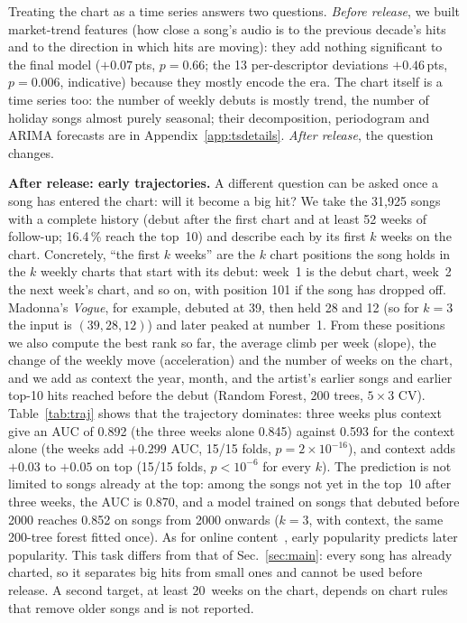\documentclass[conference]{IEEEtran}
\newcommand{\pp}{\,pts}
\begin{document}
Treating the chart as a time series answers two questions. \emph{Before release}, we built
market-trend features (how close a song's audio is to the previous decade's hits and to the direction in which
hits are moving): they add nothing significant to the final model ($+0.07$\pp, $p=0.66$; the 13 per-descriptor deviations
$+0.46$\pp, $p=0.006$, indicative) because they mostly encode the era.
The chart itself is a time series too: the number of weekly debuts is mostly trend, the number of holiday songs
almost purely seasonal; their decomposition, periodogram and ARIMA forecasts
are in Appendix~\ref{app:tsdetails}. \emph{After release}, the question changes.


\textbf{After release: early trajectories.} A different question can be asked once a song
has entered the chart: will it become a big hit? We take the 31{,}925 songs with a complete
history (debut after the first chart and at least 52 weeks of follow-up; 16.4\,\% reach
the top~10) and describe each by its first $k$ weeks on the chart. Concretely, ``the first
$k$ weeks'' are the $k$ chart positions the song holds in the $k$ weekly charts that start with
its debut: week~1 is the debut chart, week~2 the next week's chart, and so on, with position 101
if the song has dropped off. Madonna's \textit{Vogue}, for example, debuted at 39, then held 28
and 12 (so for $k=3$ the input is $(39, 28, 12)$) and later peaked at number~1. From these
positions we also compute the best rank so far, the average climb per week (slope), the change
of the weekly move (acceleration) and the number of weeks on the chart, and we add as context the
year, month, and the artist's earlier songs and earlier top-10 hits reached before the debut
(Random Forest, 200 trees, $5{\times}3$ CV). Table~\ref{tab:traj} shows that the trajectory dominates: three weeks plus
context give an AUC of 0.892 (the three weeks alone 0.845) against 0.593 for the context alone (the weeks add $+0.299$ AUC, 15/15 folds,
$p=2\times10^{-16}$), and context adds $+0.03$ to $+0.05$ on top (15/15 folds, $p<10^{-6}$ for every $k$). The prediction is not limited to songs already
at the top: among the songs not yet in the top~10 after three weeks, the AUC is 0.870, and a
model trained on songs that debuted before 2000 reaches 0.852 on songs from 2000 onwards ($k=3$, with context, the same 200-tree forest fitted once). As for online
content~\cite{szabo2010predicting}, early popularity predicts later popularity. This task
differs from that of Sec.~\ref{sec:main}: every song has already charted, so it separates
big hits from small ones and cannot be used before release. A second target, at least
20~weeks on the chart, depends on chart rules that remove older songs and is not reported.
\end{document}
